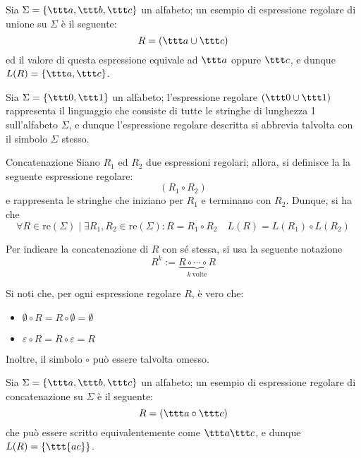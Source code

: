 \documentclass[a4paper, 12pt]{report}
\begin{document}
    \begin{example}[Unione]
        Sia $\Sigma = \{\ttt a, \ttt b, \ttt c\}$ un alfabeto; un esempio di espressione regolare di unione su $\Sigma$ è il seguente: $$R = (\ttt a \cup \ttt c)$$ ed il valore di questa espressione equivale ad $\ttt a$ oppure $\ttt c$, e dunque $L(R) = \{ \ttt a, \ttt c\}$.
    \end{example}

    \begin{example}
        Sia $\Sigma = \{\ttt 0, \ttt 1\}$ un alfabeto; l'espressione regolare $(\ttt 0 \cup \ttt 1)$ rappresenta il linguaggio che consiste di tutte le stringhe di lunghezza 1 sull'alfabeto $\Sigma$, e dunque l'espressione regolare descritta si abbrevia talvolta con il simbolo $\Sigma$ stesso.
    \end{example}

    \begin{frameddefn}{Concatenazione}
        Siano $R_1$ ed $R_2$ due espressioni regolari; allora, si definisce la  la seguente espressione regolare: $$(R_1 \circ R_2)$$ e rappresenta le stringhe che iniziano per $R_1$ e terminano con $R_2$. Dunque, si ha che $$\forall R \in \mathrm{re}(\Sigma) \mid \exists R_1, R_2 \in \mathrm{re}(\Sigma) : R = R_1 \circ R_2 \quad L(R) = L(R_1) \circ L(R_2)$$

        Per indicare la concatenazione di $R$ con sé stessa, si usa la seguente notazione $$R^k := \underbrace{R \circ \cdots \circ R}_{k \ \textrm{volte}}$$

        Si noti che, per ogni espressione regolare $R$, è vero che:

        \begin{itemize}
            \item $\emptyset \circ R = R \circ \emptyset = \emptyset$
            \item $\varepsilon \circ R = R \circ \varepsilon = R$
        \end{itemize}

        Inoltre, il simbolo $\circ$ può essere talvolta omesso.
    \end{frameddefn}

    \begin{example}[Concatenazione]
        Sia $\Sigma = \{\ttt a, \ttt b, \ttt c\}$ un alfabeto; un esempio di espressione regolare di concatenazione su $\Sigma$ è il seguente: $$R = (\ttt a \circ \ttt c)$$ che può essere scritto equivalentemente come $\ttt a \ttt c$, e dunque $L(R) = \{ \ttt{ac} \}$.
    \end{example}
\end{document}
